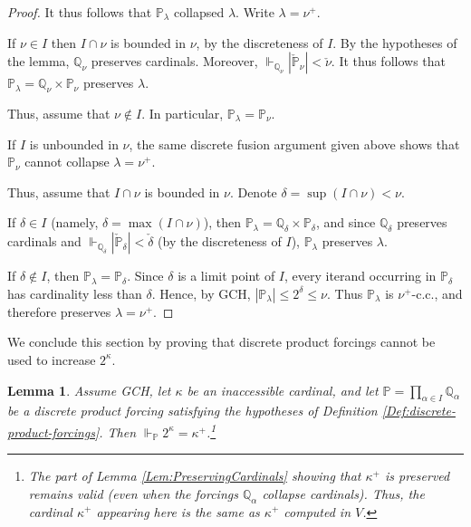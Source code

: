 \documentclass{article}
\theoremstyle{definition}
\theoremstyle{plain}
\newtheorem{lemma}[definition]{Lemma}
\newcommand{\po}{\mathbb{P}}
\newcommand{\qo}{\mathbb{Q}}
\begin{document}
\begin{proof}
    It thus follows that $\po_{\lambda}$ collapsed $\lambda$. Write $\lambda=\nu^+$. 
    
    If $\nu\in I$ then $I\cap \nu$ is bounded in $\nu$, by the discreteness of $I$. By the hypotheses of the lemma, $\qo_\nu$ preserves cardinals. Moreover, $\Vdash_{\qo_\nu} |\check{\po}_\nu|<\check{\nu}$. It thus follows that $\po_\lambda =  \qo_\nu \times \po_{\nu}$ preserves $\lambda$.

    Thus, assume that $\nu\notin I$. In particular, $\po_\lambda = \po_\nu$. 
    
    If $I$ is unbounded in $\nu$, the same discrete fusion argument given above shows that $\po_\nu$ cannot collapse $\lambda= \nu^+$.

    Thus, assume that $I\cap \nu$ is bounded in $\nu$. Denote $\delta  =\sup(I\cap \nu)<\nu$.
    
     If $\delta\in I$ (namely, $\delta = \max(I\cap \nu)$), then $\po_\lambda = \qo_\delta\times \po_\delta$, and since $\qo_\delta$ preserves cardinals and $\Vdash_{\qo_\delta} |\check{\po}_\delta|<\check{\delta}$ (by the discreteness of $I$), $\po_\lambda$ preserves $\lambda$. 
    
    If $\delta\notin I$, then $\po_\lambda=\po_\delta$. Since $\delta$ is a limit point of $I$, every iterand occurring in $\po_\delta$  has cardinality less than $\delta$. Hence, by {\rm GCH}, $|\po_\lambda|\leq 2^\delta\leq\nu$. Thus $\po_\lambda$ is $\nu^+$-c.c., and therefore preserves
    $\lambda=\nu^+$.
\end{proof}


We conclude this section by proving that discrete product forcings cannot be used to increase $2^\kappa$.

\begin{lemma}\label{Lem:PreservingGCH}
    Assume {\rm GCH}, let $\kappa$ be an inaccessible cardinal,  and let $\po = \prod_{\alpha\in I}\qo_\alpha$ be a discrete product forcing satisfying the hypotheses of Definition \ref{Def:discrete-product-forcings}. Then $\Vdash_{\po} 2^{\kappa} = \kappa^+ $.\footnote{The part of Lemma \ref{Lem:PreservingCardinals} showing that $\kappa^+$ is preserved remains valid (even when the forcings $\qo_\alpha$ collapse cardinals). Thus, the cardinal $\kappa^+$ appearing here is the same as $\kappa^+$ computed in $V$.}
\end{lemma}
\end{document}
